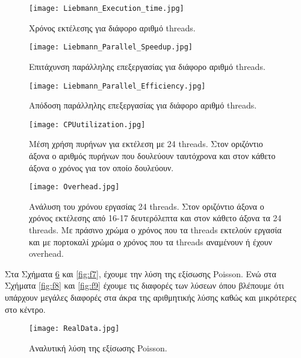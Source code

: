 \documentclass[11pt]{scrartcl} %
\begin{document}
\begin{figure}[H] 

	\centering
	\texttt{[image: Liebmann\_Execution\_time.jpg]}	
	\caption{Χρόνος εκτέλεσης για διάφορο αριθμό threads. }
	\label{fig:f1}
\end{figure}


\begin{figure}[H] 

	\centering
	\texttt{[image: Liebmann\_Parallel\_Speedup.jpg]}	
	\caption{Επιτάχυνση παράλληλης επεξεργασίας για διάφορο αριθμό threads. }
	\label{fig:f2}
\end{figure}


\begin{figure}[H] 

	\centering
	\texttt{[image: Liebmann\_Parallel\_Efficiency.jpg]}	
	\caption{Απόδοση παράλληλης επεξεργασίας για διάφορο αριθμό threads. }
	\label{fig:f3}
\end{figure}


\begin{figure}[H] 

	\centering
	\texttt{[image: CPUutilization.jpg]}	
	\caption{Μέση χρήση πυρήνων για εκτέλεση με 24 threads. Στον οριζόντιο άξονα ο αριθμός πυρήνων που δουλεύουν ταυτόχρονα και στον κάθετο άξονα ο χρόνος για τον οποίο δουλεύουν.}
	\label{fig:f4}
\end{figure}


\begin{figure}[H] 

	\centering
	\texttt{[image: Overhead.jpg]}	
	\caption{Ανάλυση του χρόνου εργασίας 24 threads. Στον οριζόντιο άξονα ο χρόνος εκτέλεσης από 16-17 δευτερόλεπτα και στον κάθετο άξονα τα 24 threads. Με πράσινο χρώμα ο χρόνος που τα threads εκτελούν εργασία και με πορτοκαλί χρώμα ο χρόνος που τα threads αναμένουν ή έχουν overhead.}
	\label{fig:f5}
\end{figure}


Στα Σχήματα \hyperref[fig:f6]{\ref{fig:f6}} και \hyperref[fig:f7]{\ref{fig:f7}}, έχουμε την λύση της εξίσωσης Poisson. Ενώ στα Σχήματα \hyperref[fig:f8]{\ref{fig:f8}} και
\hyperref[fig:f9]{\ref{fig:f9}} έχουμε τις διαφορές των λύσεων όπου βλέπουμε ότι υπάρχουν μεγάλες διαφορές στα άκρα της αριθμητικής λύσης καθώς και μικρότερες στο κέντρο.



\begin{figure}[H] 

	\centering
	\texttt{[image: RealData.jpg]}	
	\caption{Αναλυτική λύση της εξίσωσης Poisson.}
	\label{fig:f6}
\end{figure}
\end{document}
